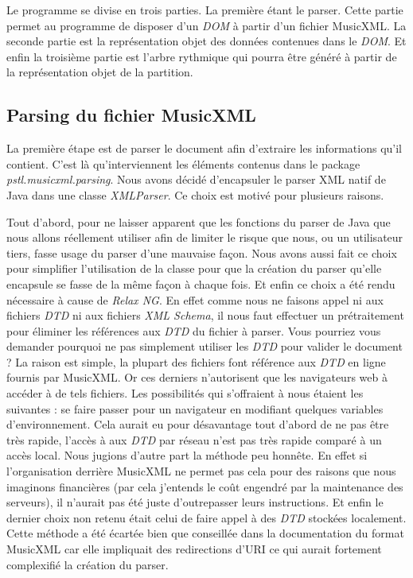 \par
Le programme se divise en trois parties. La première étant le parser. Cette partie permet au programme de disposer d'un \emph{DOM} à partir d'un fichier MusicXML. La seconde partie est la représentation objet des données contenues dans le \emph{DOM}. Et enfin la troisième partie est l'arbre rythmique qui pourra être généré à partir de la représentation objet de la partition.

\subsection{Parsing du fichier MusicXML}

\par
La première étape est de parser le document afin d'extraire les informations qu'il contient. C'est là qu'interviennent les éléments contenus dans le package \emph{pstl.musicxml.parsing}. Nous avons décidé d'encapsuler le parser XML natif de Java dans une classe \emph{XMLParser}. Ce choix est motivé pour plusieurs raisons.

\par
Tout d'abord, pour ne laisser apparent que les fonctions du parser de Java que nous allons réellement utiliser afin de limiter le risque que nous, ou un utilisateur tiers, fasse usage du parser d'une mauvaise façon. Nous avons aussi fait ce choix pour simplifier l'utilisation de la classe pour que la création du parser qu'elle encapsule se fasse de la même façon à chaque fois. Et enfin ce choix a été rendu nécessaire à cause de \emph{Relax NG}. En effet comme nous ne faisons appel ni aux fichiers \emph{DTD} ni aux fichiers \emph{XML Schema}, il nous faut effectuer un prétraitement pour éliminer les références aux \emph{DTD} du fichier à parser. Vous pourriez vous demander pourquoi ne pas simplement utiliser les \emph{DTD} pour valider le document ? La raison est simple, la plupart des fichiers font référence aux \emph{DTD} en ligne fournis par MusicXML. Or ces derniers n'autorisent que les navigateurs web à accéder à de tels fichiers. Les possibilités qui s'offraient à nous étaient les suivantes : se faire passer pour un navigateur en modifiant quelques variables d’environnement. Cela aurait eu pour désavantage tout d'abord de ne pas être très rapide, l'accès à aux \emph{DTD} par réseau n'est pas très rapide comparé à un accès local. Nous jugions d'autre part la méthode peu honnête. En effet si l'organisation derrière MusicXML ne permet pas cela pour des raisons que nous imaginons financières (par cela j'entends le coût engendré par la maintenance des serveurs), il n'aurait pas été juste d'outrepasser leurs instructions. Et enfin le dernier choix non retenu était celui de faire appel à des \emph{DTD} stockées localement. Cette méthode a été écartée bien que conseillée dans la documentation du format MusicXML car elle impliquait des redirections d'URI ce qui aurait fortement complexifié la création du parser.

